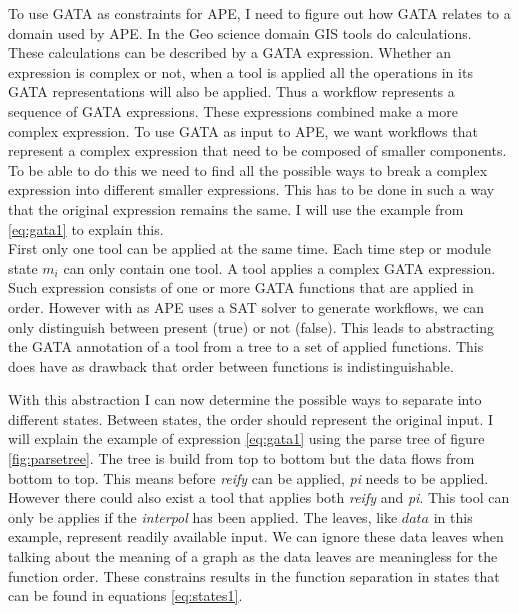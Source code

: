 \documentclass{article}
\begin{document}
To use GATA as constraints for APE, I need to figure out how GATA relates to a domain used by APE. In the Geo science domain GIS tools do calculations. These calculations can be described by a GATA expression. Whether an expression is complex or not, when a tool is applied all the operations in its GATA representations will also be applied. Thus a workflow represents a sequence of GATA expressions. These expressions combined make a more complex expression. To use GATA as input to APE, we want workflows that represent a complex expression that need to be composed of smaller components. To be able to do this we need to find all the possible ways to break a complex expression into different smaller expressions. This has to be done in such a way that the original expression remains the same. I will use the example from \ref{eq:gata1} to explain this. 
\\

First only one tool can be applied at the same time. Each time step or module state $m_i$ can only contain one tool. A tool applies a complex GATA expression. Such expression consists of one or more GATA functions that are applied in order. However with as APE uses a SAT solver to generate workflows, we can only distinguish between present (true) or not (false).  This leads to abstracting the GATA annotation of a tool from a tree to a set of applied functions. This does have as drawback that order between functions is indistinguishable.  

With this abstraction I can now determine the possible ways to separate into different states. Between states, the order should represent the original input. I will explain the example of expression \ref{eq:gata1} using the parse tree of figure \ref{fig:parsetree}. The tree is build from top to bottom but the data flows from bottom to top. This means before \textit{reify} can be applied, \textit{pi} needs to be applied. However there could also exist a tool that applies both \textit{reify} and \textit{pi}. This tool can only be applies if the \textit{interpol} has been applied. The leaves, like $data$ in this example, represent readily available input. We can ignore these data leaves when talking about the meaning of a graph as the data leaves are meaningless for the function order. These constrains results in the function separation in states that can be found in equations \ref{eq:states1}.
\end{document}
